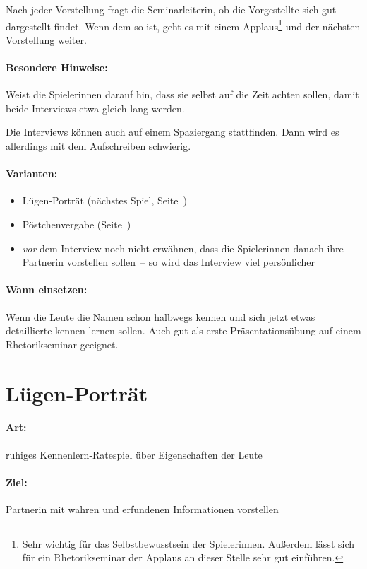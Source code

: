Nach jeder Vorstellung fragt die Seminarleiterin, ob die Vorgestellte sich gut dargestellt findet. Wenn dem so ist, geht es mit einem Applaus\footnote{Sehr wichtig für das Selbstbewusstsein der Spielerinnen. Außerdem lässt sich für ein Rhetorikseminar der Applaus an dieser Stelle sehr gut einführen.} und der nächsten Vorstellung weiter.
\paragraph{Besondere Hinweise:} Weist die Spielerinnen darauf hin, dass sie selbst auf die Zeit achten sollen, damit beide Interviews etwa gleich lang werden.

Die Interviews können auch auf einem Spaziergang stattfinden. Dann wird es allerdings mit dem Aufschreiben schwierig.
\paragraph{Varianten:}
\begin{itemize}
  \item Lügen-Porträt (nächstes Spiel, Seite~\pageref{luegenportrait})
  \item Pöstchenvergabe (Seite~\pageref{poestchenvergabe})
  \item \emph{vor} dem Interview noch nicht erwähnen, dass die Spielerinnen danach ihre Partnerin vorstellen sollen~-- so wird das Interview viel persönlicher  
\end{itemize}

\paragraph{Wann einsetzen:} Wenn die Leute die Namen schon halbwegs kennen und sich jetzt etwas detaillierte kennen lernen sollen. Auch gut als erste Präsentationsübung auf einem Rhetorikseminar geeignet.

\section{Lügen-Porträt}
\label{luegenportrait}
\paragraph{Art:} ruhiges Kennenlern-Ratespiel über Eigenschaften der Leute
\paragraph{Ziel:} Partnerin mit wahren und erfundenen Informationen vorstellen
